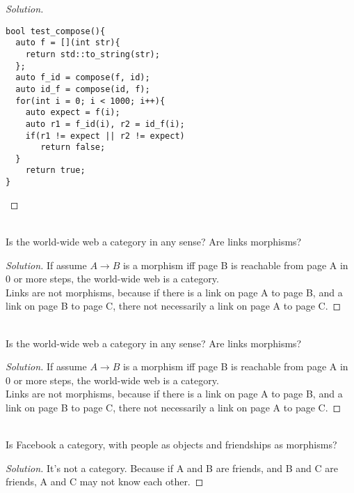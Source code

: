 \documentclass[7x10,thmnumcontwithchapter,WebLink,AddlevelTwoTOC,NumRef,BookEndNote,printer]{pupbook}
\begin{document}
\begin{proof}[Solution]
~\\
\begin{lstlisting}
bool test_compose(){
  auto f = [](int str){
    return std::to_string(str);
  };
  auto f_id = compose(f, id);
  auto id_f = compose(id, f);
  for(int i = 0; i < 1000; i++){
    auto expect = f(i);
    auto r1 = f_id(i), r2 = id_f(i);
    if(r1 != expect || r2 != expect) 
       return false;
  }
    return true;
}
\end{lstlisting}
\end{proof}


\begin{exercise}
~\\
Is the world-wide web a category in any sense? Are links morphisms?
\end{exercise}

\begin{proof}[Solution]
If assume $A \rightarrow B$ is a morphism iff page B is reachable from page A in 0 or more steps, the world-wide web is a category.  \\
Links are not morphisms, because if there is a link on page A to page B, and a link on page B to page C, there not necessarily a link on page A to page C.
\end{proof}

\begin{exercise}
	~\\
	Is the world-wide web a category in any sense? Are links morphisms?
\end{exercise}

\begin{proof}[Solution]
	If assume $A \rightarrow B$ is a morphism iff page B is reachable from page A in 0 or more steps, the world-wide web is a category.  \\
	Links are not morphisms, because if there is a link on page A to page B, and a link on page B to page C, there not necessarily a link on page A to page C.
\end{proof}


\begin{exercise}
	~\\
Is Facebook a category, with people as objects and friendships as morphisms?
\end{exercise}

\begin{proof}[Solution]
It's not a category. Because if A and B are friends, and B and C are friends, A and C may not know each other.
\end{proof}
\end{document}
